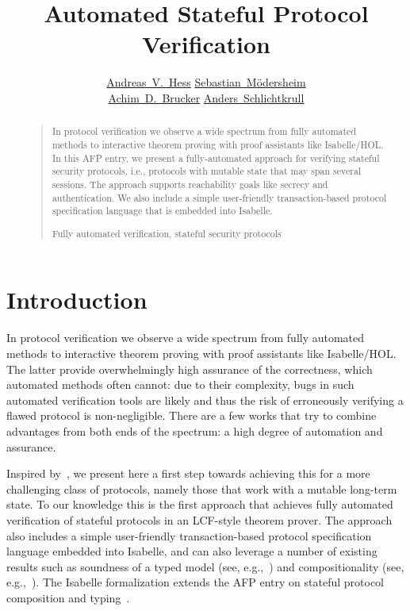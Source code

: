 \documentclass[10pt,DIV16,a4paper,abstract=true,twoside=semi,openright]
{scrreprt}
\title{Automated Stateful Protocol Verification}
\author{%
\begin{minipage}{.8\textwidth}
  \centering
      \href{https://www.dtu.dk/english/service/phonebook/person?id=64207}{Andreas~V.~Hess}\footnotemark[1]
      \qquad\qquad
      \href{https://people.compute.dtu.dk/samo/}{Sebastian~M{\"o}dersheim}\footnotemark[1]
      \\
      \href{http://www.brucker.ch/}{Achim~D.~Brucker}\footnotemark[2]
      \qquad\qquad
      \href{https://people.cs.aau.dk/~andsch/}{Anders~Schlichtkrull}\footnotemark[3]
     \end{minipage}
}
\begin{document}
  \maketitle
  \begin{abstract}
    \begin{quote}
      In protocol verification we observe a wide spectrum from fully
      automated methods to interactive theorem proving with proof
      assistants like Isabelle/HOL.
      In this AFP entry, we present a fully-automated approach for
      verifying stateful security protocols, i.e., protocols with mutable
      state that may span several sessions.
      The approach supports reachability goals like secrecy and
      authentication.
      We also include a simple user-friendly transaction-based
      protocol specification language that is embedded into Isabelle.
      
    \bigskip
      Fully automated verification, stateful security protocols
    \end{quote}
  \end{abstract}


\tableofcontents
\cleardoublepage

\chapter{Introduction}
  In protocol verification we observe a wide spectrum from fully
  automated methods to interactive theorem proving with proof
  assistants like Isabelle/HOL. The latter provide overwhelmingly high
  assurance of the correctness, which automated methods often cannot:
  due to their complexity, bugs in such automated verification tools
  are likely and thus the risk of erroneously verifying a flawed
  protocol is non-negligible. There are a few works that try to
  combine advantages from both ends of the spectrum: a high degree of
  automation and assurance.

  Inspired by~\cite{brucker.ea:integrating:2009}, we present here a
  first step towards achieving this for a more challenging class of
  protocols, namely those that work with a mutable long-term state. To
  our knowledge this is the first approach that achieves fully
  automated verification of stateful protocols in an LCF-style theorem
  prover.  The approach also includes a simple user-friendly
  transaction-based protocol specification language embedded into
  Isabelle, and can also leverage a number of existing results such as
  soundness of a typed model (see,
  e.g.,~\cite{hess:typing:2018,hess.ea:formalizing:2017,hess.ea:typing:2018})
  and compositionality (see,
  e.g.,~\cite{hess:typing:2018,hess.ea:stateful:2018}). The Isabelle 
  formalization extends the AFP entry on stateful protocol composition and 
  typing~\cite{hess.ea:stateful:2020}.
\end{document}
